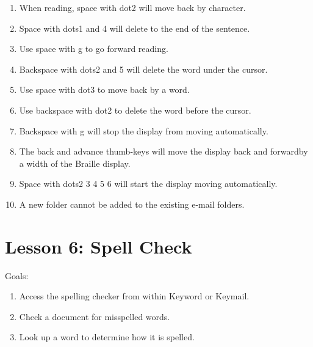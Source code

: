 \documentclass[10pt,letterpaper,twoside]{report}
\begin{document}
{{{{\begin{enumerate}
	\item When reading, space with dot2 will move back by character.
	      
	\item Space with dots1 and 4 will delete to the end of the sentence.
	      
	\item Use space with g to go forward reading.
	      
	\item Backspace with dots2 and 5 will delete the word under the cursor.
	      
	\item Use space with dot3 to move back by a word.
	      
	\item Use backspace with dot2 to delete the word before the cursor.
	      
	\item Backspace with g will stop the display from moving automatically.
	      
	\item The back and advance thumb-keys will move the display back and forwardby a width of the Braille display.
	      
	\item Space with dots2 3 4 5 6 will start the display moving automatically.
	      
	\item A new folder cannot be added to the existing e-mail folders.
\end{enumerate}



\section*{Lesson 6: Spell Check}


Goals:



\begin{enumerate}
	\item Access the spelling checker from within Keyword or Keymail.
	      
	\item Check a document for misspelled words.
	      
	\item Look up a word to determine how it is spelled.
	      

\end{enumerate}}}}}
\end{document}
